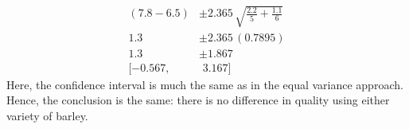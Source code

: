\documentclass[12pt]{article}
\begin{document}
{\begin{minipage}[t]{0.98\textwidth}
\begin{minipage}[t]{0.47\textwidth}
\begin{enumerate}
\begin{align*}
(7.8 - 6.5) &\pm 2.365 \, \sqrt{\frac{2.2}{5}+\frac{1.1}{6}} \\[0.2cm]
1.3 &\pm 2.365 \, (0.7895) \\[0.2cm]
1.3 &\pm 1.867 \\[0.2cm]
[-0.567,&\,\,3.167]
\end{align*}
Here, the confidence interval is much the same as in the equal variance approach. Hence, the conclusion is the same: there is no difference in quality using either variety of barley.
\end{enumerate}
\end{minipage}
\end{minipage}}\vspace{0.03\textwidth}




\end{document}

